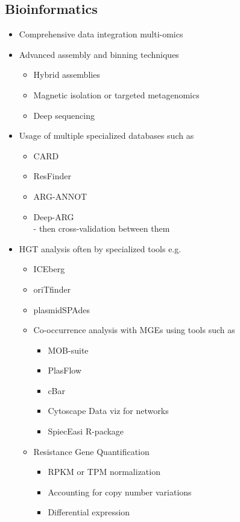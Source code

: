 \documentclass[11pt]{report}
\begin{document}
{\subsection{Bioinformatics}
\begin{itemize}
	\item Comprehensive data integration \dotfill multi-omics
	\item Advanced assembly and binning techniques 
	\begin{itemize}
		\item Hybrid assemblies 
		\item Magnetic isolation or targeted metagenomics
		\item Deep sequencing 
	\end{itemize}
	\item Usage of multiple specialized databases such as 
	\begin{itemize}
		\item CARD
		\item ResFinder
		\item ARG-ANNOT
		\item Deep-ARG\\
		- then cross-validation between them 
	\end{itemize}
	\item HGT analysis often by specialized tools e.g.
	\begin{itemize}
		\item ICEberg
		\item oriTfinder
		\item plasmidSPAdes\\
	\item Co-occurrence analysis with MGEs using tools such as \begin{itemize}
		\item MOB-suite
		\item PlasFlow
		\item cBar
		\item Cytoscape \dotfill Data viz for networks
		\item SpiecEasi \dotfill R-package
	\end{itemize}
	\item Resistance Gene Quantification 
	\begin{itemize}
		\item RPKM or TPM normalization
		\item Accounting for copy number variations
		\item Differential expression 
	\end{itemize}

\end{itemize}
\end{itemize}}
\end{document}
